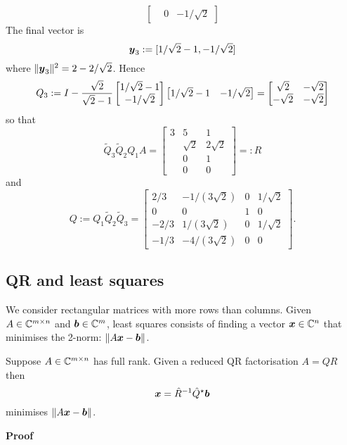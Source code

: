 \begin{example}
\[\begin{bmatrix}
& 0 & -1/\sqrt{2}
\end{bmatrix}
\]
The final vector is 
\[
\bm{{\mbox{\boldmath$y$\unboldmath}}}_3 := [1/\sqrt{2}-1,-1/\sqrt{2}]
\]
where $\| \bm{{\mbox{\boldmath$y$\unboldmath}}}_3 \|^2 = 2 - 2/\sqrt{2}$. Hence
\[
Q_3 := I - {\sqrt{2} \over \sqrt{2} - 1} \begin{bmatrix}
1/\sqrt{2}-1 \\
-1/\sqrt{2}
\end{bmatrix} \begin{bmatrix}
1/\sqrt{2}-1 &
-1/\sqrt{2}
\end{bmatrix} =
\begin{bmatrix}
\sqrt{2} & -\sqrt{2}\\
-\sqrt{2} & -\sqrt{2}
\end{bmatrix}
\]
so that 
\[
\tilde Q_3 \tilde Q_2 Q_1 A = \begin{bmatrix} 3 & 5 & 1 \\
 & \sqrt{2} & 2\sqrt{2} \\
  & 0 & 1 \\
& 0 & 0
\end{bmatrix} =: R
\]
and
\[
Q := Q_1 \tilde Q_2 \tilde Q_3 =  \begin{bmatrix}
2/3 & -1/(3\sqrt{2}) & 0 & 1/\sqrt{2} \\
0 &  0 & 1 & 0 \\
-2/3 & 1/(3\sqrt{2}) & 0 & 1/\sqrt{2} \\ 
-1/3 & - 4/(3\sqrt{2}) & 0 & 0
\end{bmatrix}.
\]
\subsection{QR and least squares}
We consider rectangular matrices with more rows than columns. Given $A \in {\mathbb C}^{m \times n}$ and $\bm{{\mbox{\boldmath$b$\unboldmath}}} \in {\mathbb C}^m$, least squares consists of finding a vector $\bm{{\mbox{\boldmath$x$\unboldmath}}} \in {\mathbb C}^n$ that minimises the 2-norm: $\| A \bm{{\mbox{\boldmath$x$\unboldmath}}} - \bm{{\mbox{\boldmath$b$\unboldmath}}} \|$.

\begin{theorem} Suppose $A \in {\mathbb C}^{m \times n}$ has full rank. Given a reduced QR factorisation $A = Q R$ then
\[
\bm{{\mbox{\boldmath$x$\unboldmath}}} = \hat R^{-1} \hat Q^\star \bm{{\mbox{\boldmath$b$\unboldmath}}}
\]
minimises $\| A \bm{{\mbox{\boldmath$x$\unboldmath}}} - \bm{{\mbox{\boldmath$b$\unboldmath}}} \|$. 

\end{theorem}
\textbf{Proof}


\end{example}
